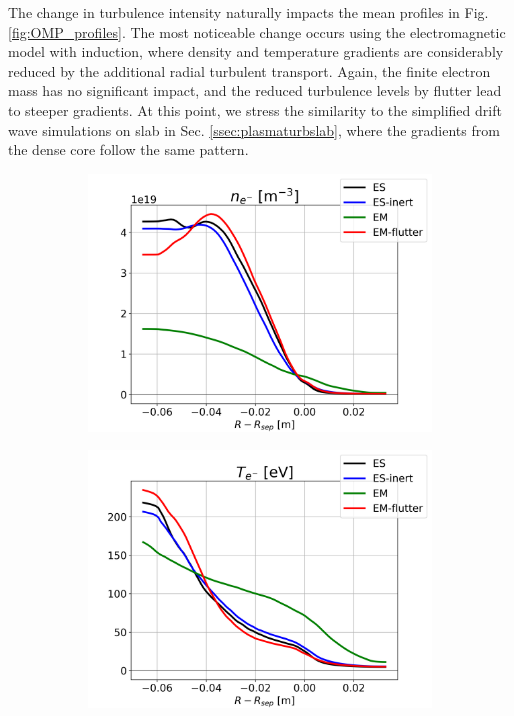 The change in turbulence intensity naturally impacts the mean profiles in Fig. \ref{fig:OMP_profiles}. The most noticeable change occurs using the electromagnetic model with induction, where density and temperature gradients are considerably reduced by the additional radial turbulent transport. Again, the finite electron mass has no significant impact, and the reduced turbulence levels by flutter lead to steeper gradients. At this point, we stress the similarity to the simplified drift wave simulations on slab in Sec. \ref{ssec:plasmaturbslab}, where the gradients from the dense core follow the same pattern. \newline

\begin{figure}[H]\centering
	\begin{subfigure}[t]{0.30\textwidth}
		\centering
		\includegraphics[width=1\textwidth]{schemes/OMP_profiles_e-_n.png}
	\end{subfigure}	
	\begin{subfigure}[t]{0.30\textwidth}
		\centering
		\includegraphics[width=1\textwidth]{schemes/OMP_profiles_e-_T.png}

\end{subfigure}
\end{figure}
